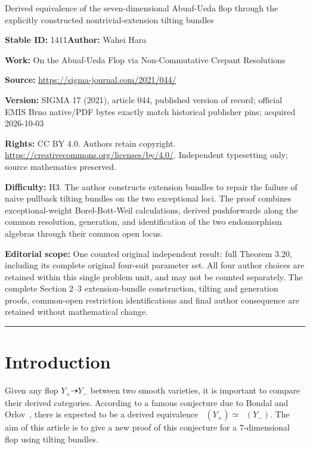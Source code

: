 \documentclass[11pt]{article}
\DeclareMathOperator{\D}{D^b}
\numberwithin{equation}{section}
\begin{document}
\begin{center}\Large Derived equivalence of the seven-dimensional Abuaf-Ueda flop through the explicitly constructed nontrivial-extension tilting bundles\end{center}
\noindent\textbf{Stable ID:} 1411\quad\textbf{Author:} Wahei Hara\par
\noindent\textbf{Work:} On the Abuaf-Ueda Flop via Non-Commutative Crepant Resolutions\par
\noindent\textbf{Source:} \url{https://sigma-journal.com/2021/044/}\par
\noindent\textbf{Version:} SIGMA 17 (2021), article 044, published version of record; official EMIS Brno native/PDF bytes exactly match historical publisher pins; acquired 2026-10-03\par
\noindent\textbf{Rights:} CC BY 4.0. Authors retain copyright. \url{https://creativecommons.org/licenses/by/4.0/}. Independent typesetting only; source mathematics preserved.\par
\noindent\textbf{Difficulty:} H3. The author constructs extension bundles to repair the failure of naive pullback tilting bundles on the two exceptional loci. The proof combines exceptional-weight Borel-Bott-Weil calculations, derived pushforwards along the common resolution, generation, and identification of the two endomorphism algebras through their common open locus.\par
\medskip\noindent\textbf{Editorial scope:} One counted original independent result: full Theorem 3.20, including its complete original four-suit parameter set. All four author choices are retained within this single problem unit, and may not be counted separately. The complete Section 2--3 extension-bundle construction, tilting and generation proofs, common-open restriction identifications and final author consequence are retained without mathematical change.\par
\medskip\hrule\medskip
\section{Introduction}

Given any flop $Y_+ \dashrightarrow Y_-$ between two smooth varieties,
it is important to compare their derived categories.
According to a famous conjecture due to Bondal and Orlov~\cite{BO02}, there is expected to be a derived equivalence $\D(Y_+) \simeq \D(Y_-)$.
The aim of this article is to give a new proof of this conjecture for a $7$-dimensional flop using tilting bundles.
\end{document}
